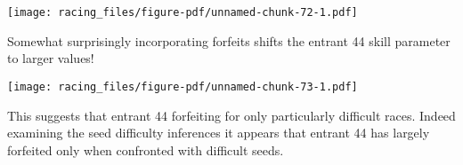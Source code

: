 \documentclass[
  letterpaper,
  DIV=11,
  numbers=noendperiod]{scrartcl}
\newenvironment{Shaded}{\begin{snugshade}}{\end{snugshade}}
\newcommand{\AttributeTok}[1]{\textcolor[rgb]{0.40,0.45,0.13}{#1}}
\newcommand{\ConstantTok}[1]{\textcolor[rgb]{0.56,0.35,0.01}{#1}}
\newcommand{\DecValTok}[1]{\textcolor[rgb]{0.68,0.00,0.00}{#1}}
\newcommand{\FloatTok}[1]{\textcolor[rgb]{0.68,0.00,0.00}{#1}}
\newcommand{\FunctionTok}[1]{\textcolor[rgb]{0.28,0.35,0.67}{#1}}
\newcommand{\NormalTok}[1]{\textcolor[rgb]{0.00,0.23,0.31}{#1}}
\newcommand{\SpecialCharTok}[1]{\textcolor[rgb]{0.37,0.37,0.37}{#1}}
\newcommand{\StringTok}[1]{\textcolor[rgb]{0.13,0.47,0.30}{#1}}
\begin{document}
\texttt{[image: racing\_files/figure-pdf/unnamed-chunk-72-1.pdf]}

Somewhat surprisingly incorporating forfeits shifts the entrant 44 skill
parameter to larger values!

\begin{Shaded}
\end{Shaded}

\texttt{[image: racing\_files/figure-pdf/unnamed-chunk-73-1.pdf]}

This suggests that entrant 44 forfeiting for only particularly difficult
races. Indeed examining the seed difficulty inferences it appears that
entrant 44 has largely forfeited only when confronted with difficult
seeds.
\end{document}
